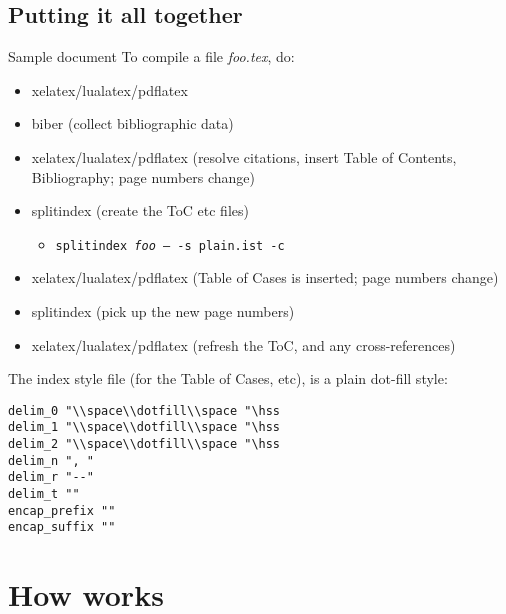 \subsection{Putting it all together}
Sample document
To compile a file \textit{foo.tex}, do:
\begin{itemize}
\item xelatex/lualatex/pdflatex
\item biber (collect bibliographic data)
\item xelatex/lualatex/pdflatex (resolve citations, insert Table of Contents, Bibliography; page numbers change)
\item splitindex (create the ToC etc files)
\begin{itemize}
\item[] \texttt{splitindex \textit{foo} -- -s plain.ist -c}
\end{itemize}
\item xelatex/lualatex/pdflatex (Table of Cases is inserted; page numbers change)
\item splitindex (pick up the new page numbers)
\item xelatex/lualatex/pdflatex (refresh the ToC, and any cross-references)
\end{itemize}
The index style file (for the Table of Cases, etc), is a plain dot-fill style:
\begin{verbatim}
delim_0 "\\space\\dotfill\\space "\hss
delim_1 "\\space\\dotfill\\space "\hss
delim_2 "\\space\\dotfill\\space "\hss
delim_n ", "
delim_r "--"
delim_t ""
encap_prefix ""
encap_suffix ""
\end{verbatim}

\section{How  works}

